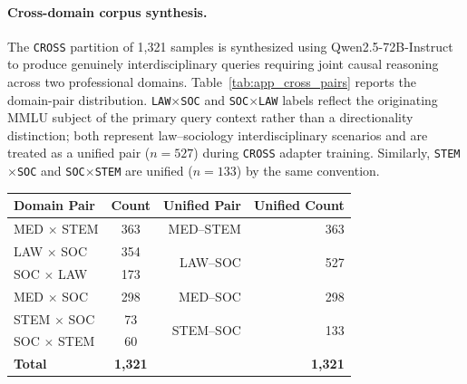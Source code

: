 \documentclass[a4paper,fleql]{cas-sc}
\begin{document}
\paragraph{Cross-domain corpus synthesis.}
The \texttt{CROSS} partition of 1,321 samples is synthesized using
Qwen2.5-72B-Instruct to produce genuinely interdisciplinary queries
requiring joint causal reasoning across two professional domains.
Table~\ref{tab:app_cross_pairs} reports the domain-pair distribution.
\texttt{LAW$\times$SOC} and \texttt{SOC$\times$LAW} labels reflect the
originating MMLU subject of the primary query context rather than a
directionality distinction; both represent law--sociology interdisciplinary
scenarios and are treated as a unified pair ($n{=}527$) during
\texttt{CROSS} adapter training. Similarly, \texttt{STEM$\times$SOC} and
\texttt{SOC$\times$STEM} are unified ($n{=}133$) by the same convention.

\vspace{6pt plus 4pt minus 3pt}
\begin{center}
\begingroup
{}
\label{tab:app_cross_pairs}
\renewcommand{\arraystretch}{1.8}
\begin{tabular}{lcrr}
\toprule
\textbf{Domain Pair} & \textbf{Count} & \textbf{Unified Pair} & \textbf{Unified Count} \\
\midrule
MED $\times$ STEM  & 363 & MED--STEM & 363 \\
\midrule
LAW $\times$ SOC   & 354 & \multirow{2}{*}{LAW--SOC} & \multirow{2}{*}{527} \\
SOC $\times$ LAW   & 173 & & \\
\midrule
MED $\times$ SOC   & 298 & MED--SOC  & 298 \\
\midrule
STEM $\times$ SOC  &  73 & \multirow{2}{*}{STEM--SOC} & \multirow{2}{*}{133} \\
SOC $\times$ STEM  &  60 & & \\
\midrule
\textbf{Total} & \textbf{1,321} & & \textbf{1,321} \\
\bottomrule
\end{tabular}
\endgroup
\end{center}
\vspace{6pt plus 4pt minus 3pt}
\end{document}
